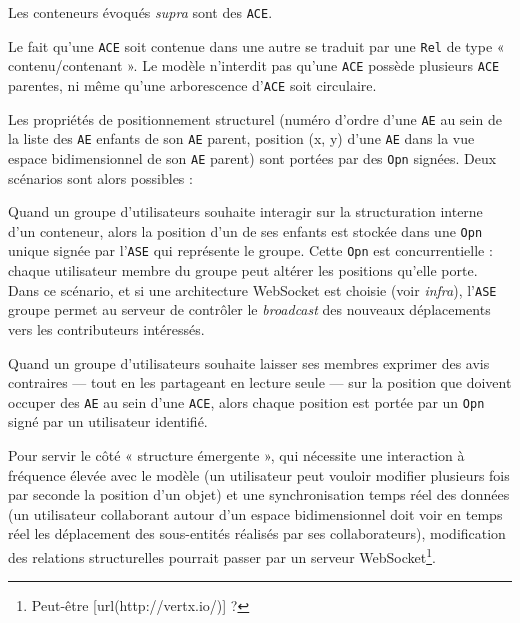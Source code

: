 Les conteneurs évoqués {\it supra} sont des {\tt ACE}.

Le fait qu'une {\tt ACE} soit contenue dans une autre se traduit par une {\tt Rel} de type « contenu/contenant ».
Le modèle n'interdit pas qu'une {\tt ACE} possède plusieurs {\tt ACE} parentes, ni même qu'une arborescence d'{\tt ACE} soit circulaire.

Les propriétés de positionnement structurel (numéro d'ordre d'une {\tt AE} au sein de la liste des {\tt AE} enfants de son {\tt AE} parent, position (x, y) d'une {\tt AE} dans la vue espace bidimensionnel de son {\tt AE} parent) sont portées par des {\tt Opn} signées.
Deux scénarios sont alors possibles :

\startitemize
	\item
	Quand un groupe d'utilisateurs souhaite interagir sur la structuration interne d'un conteneur, alors la position d'un de ses enfants est stockée dans une {\tt Opn} unique signée par l'{\tt ASE} qui représente le groupe.
	Cette {\tt Opn} est concurrentielle : chaque utilisateur membre du groupe peut altérer les positions qu'elle porte.
	Dans ce scénario, et si une architecture WebSocket est choisie (voir {\it infra}), l'{\tt ASE} groupe permet au serveur de contrôler le {\it broadcast} des nouveaux déplacements vers les contributeurs intéressés.
	\item
	Quand un groupe d'utilisateurs souhaite laisser ses membres exprimer des avis contraires --- tout en les partageant en lecture seule --- sur la position que doivent occuper des {\tt AE} au sein d'une {\tt ACE}, alors chaque position est portée par un {\tt Opn} signé par un utilisateur identifié.
\stopitemize

\startsection[title={Éléments d'implémentation}]

Pour servir le côté « structure émergente », qui nécessite une interaction à fréquence élevée avec le modèle (un utilisateur peut vouloir modifier plusieurs fois par seconde la position d'un objet) et une synchronisation temps réel des données (un utilisateur collaborant autour d'un espace bidimensionnel doit voir en temps réel les déplacement des sous-entités réalisés par ses collaborateurs), modification des relations structurelles pourrait passer par un serveur WebSocket\footnote{Peut-être [url(http://vertx.io/)] ?}.